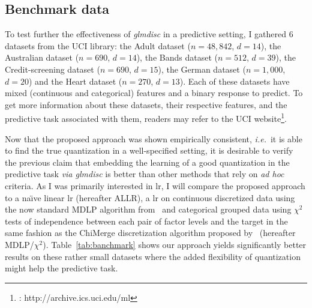 \subsection{Benchmark data} \label{subsec:exp_benchmark}

To test further the effectiveness of \textit{glmdisc} in a predictive setting, I gathered 6 datasets from the UCI library: the Adult dataset ($n=48,842$, $d=14$), the Australian dataset ($n=690$, $d=14$), the Bands dataset ($n=512$, $d=39$), the Credit-screening dataset ($n=690$, $d=15$), the German dataset ($n=1,000$, $d=20$) and the Heart dataset ($n=270$, $d=13$). Each of these datasets have mixed (continuous and categorical) features and a binary response to predict. To get more information about these datasets, their respective features, and the predictive task associated with them, readers may refer to the UCI website\footnote{\cite{Dua:2017} : http://archive.ics.uci.edu/ml}.

Now that the proposed approach was shown empirically consistent, \textit{i.e.}\ it is able to find the true quantization in a well-specified setting, it is desirable to verify the previous claim that embedding the learning of a good quantization in the predictive task \textit{via glmdisc} is better than other methods that rely on \textit{ad hoc} criteria. As I was primarily interested in \gls{lr}, I will compare the proposed approach to a na\"{\i}ve linear \gls{lr} (hereafter ALLR), a \gls{lr} on continuous discretized data using the now standard MDLP algorithm from~\cite{fayyad1993multi} and categorical grouped data using $\chi^2$ tests of independence between each pair of factor levels and the target in the same fashion as the ChiMerge discretization algorithm proposed by~\cite{kerber1992chimerge} (hereafter MDLP/$\chi^2$). Table~\ref{tab:banchmark} shows our approach yields significantly better results on these rather small datasets where the added flexibility of quantization might help the predictive task.

